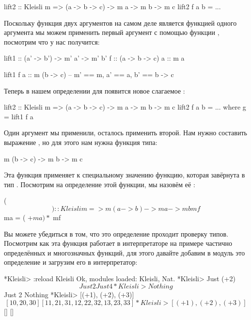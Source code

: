 \begin{code}
lift2 :: Kleisli m => (a -> b -> c) -> m a -> m b -> m c
lift2 f a b = ...
\end{code}

Поскольку функция двух аргументов на самом деле является
функцией одного аргумента мы можем применить первый аргумент
с помощью функции , посмотрим что у нас получится:

\begin{code}
lift1       :: (a' -> b') -> m' a' -> m' b'
f           :: (a -> b -> c)
a           :: m a

lift1 f a   :: m (b -> c)  -- m' == m, a' == a, b' == b -> c
\end{code}

Теперь в нашем определении для  появится
новое слагаемое :

\begin{code}
lift2 :: Kleisli m => (a -> b -> c) -> m a -> m b -> m c
lift2 f a b = ...
    where g = lift1 f a
\end{code}

Один аргумент мы применили, осталось применить второй.
Нам нужно составить выражение , но 
для этого нам нужна функция типа:

\begin{code}
m (b -> c) -> m b -> m c
\end{code}

Эта функция применяет к специальному значению 
функцию, которая завёрнута в тип . 
Посмотрим на определение этой функции, мы назовём её
\In{$$}:

\begin{code}
($$) :: Kleisli m => m (a -> b) -> m a -> m b
mf $$ ma = ( +$ ma) *$ mf
\end{code}

Вы можете убедиться в том, что это определение проходит проверку типов.
Посмотрим как эта функция работает в интерпретаторе на примере
частично определённых и многозначных функций, для этого давайте
добавим в модуль  это определение и загрузим
его в интерпретатор:

\begin{code}
*Kleisli> :reload Kleisli
Ok, modules loaded: Kleisli, Nat.
*Kleisli> Just (+2) $$ Just 2
Just 4
*Kleisli> Nothing $$ Just 2
Nothing
*Kleisli> [(+1), (+2), (+3)] $$ [10,20,30]
[11,21,31,12,22,32,13,23,33]
*Kleisli> [(+1), (+2), (+3)] $$ []
[]
\end{code}

